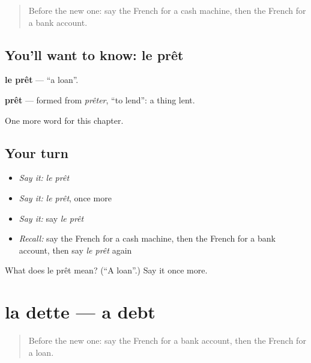 \label{lesson:FR-C226-pret}



\begin{quote}
Before the new one: say the French for a cash machine, then the French for a bank account.
\end{quote}

\subsection*{You'll want to know: le prêt}
\textbf{le prêt} — \textquotedblleft{}a loan\textquotedblright{}.

\begin{cousinweb}
\textbf{prêt} — formed from \emph{prêter}, \textquotedblleft{}to lend\textquotedblright{}: a thing lent.
\end{cousinweb}

\begin{grammarlens}[title={What you've built}]
One more word for this chapter.
\end{grammarlens}

\subsection*{Your turn}
\begin{itemize}
\raggedright
  \item \emph{Say it:} \emph{le prêt}
  \item \emph{Say it:} \emph{le prêt}, once more
  \item \emph{Say it:} say \emph{le prêt}
  \item \emph{Recall:} say the French for a cash machine, then the French for a bank account, then say \emph{le prêt} again
\end{itemize}

\begin{tcolorbox}[breakable,colback=teal!4,colframe=teal!35!black,title={Before you move on}]
What does le prêt mean? (\textquotedblleft{}A loan\textquotedblright{}.) Say it once more.
\end{tcolorbox}
\section[la dette]{la dette — a debt}

\label{lesson:FR-C226-dette}



\begin{quote}
Before the new one: say the French for a bank account, then the French for a loan.
\end{quote}

